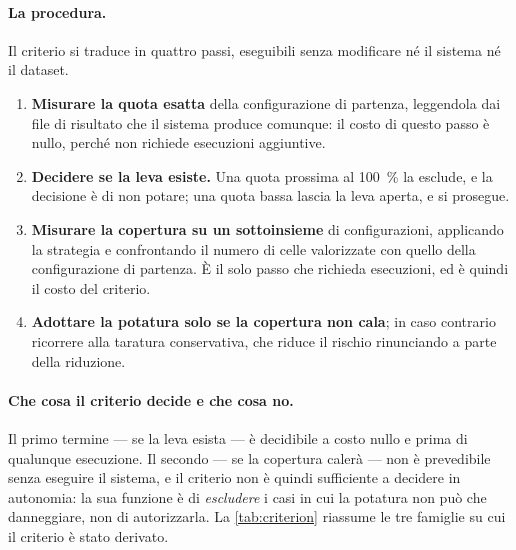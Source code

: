 \paragraph{La procedura.} Il criterio si traduce in quattro passi, eseguibili senza modificare né
il sistema né il dataset.

\begin{enumerate}[leftmargin=1.6em]
    \item \textbf{Misurare la quota esatta} della configurazione di partenza, leggendola dai file
    di risultato che il sistema produce comunque: il costo di questo passo è nullo, perché non
    richiede esecuzioni aggiuntive.
    \item \textbf{Decidere se la leva esiste.} Una quota prossima al \SI{100}{\percent} la
    esclude, e la decisione è di non potare; una quota bassa lascia la leva aperta, e si prosegue.
    \item \textbf{Misurare la copertura su un sottoinsieme} di configurazioni, applicando la
    strategia e confrontando il numero di celle valorizzate con quello della configurazione di
    partenza. È il solo passo che richieda esecuzioni, ed è quindi il costo del criterio.
    \item \textbf{Adottare la potatura solo se la copertura non cala}; in caso contrario ricorrere
    alla taratura conservativa, che riduce il rischio rinunciando a parte della riduzione.
\end{enumerate}

\paragraph{Che cosa il criterio decide e che cosa no.} Il primo termine --- se la leva esista --- è
decidibile a costo nullo e prima di qualunque esecuzione. Il secondo --- se la copertura calerà
--- non è prevedibile senza eseguire il sistema, e il criterio non è quindi sufficiente a decidere
in autonomia: la sua funzione è di \emph{escludere} i casi in cui la potatura non può che
danneggiare, non di autorizzarla. La \autoref{tab:criterion} riassume le tre famiglie su cui il
criterio è stato derivato.

